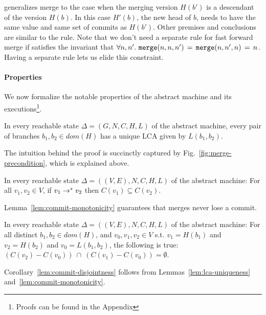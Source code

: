  generalizes merge to the case when the merging
version $H(b')$ is a descendant of the version $H(b)$. In this case
$H'(b)$, the new head of $b$, needs to have the same value and same
set of commits as $H(b')$. Other premises and conclusions are similar
to the  rule. Note that we don't need a separate rule
for fast forward merge if  satisfies the invariant that
$\forall n, n'.~ {\tt merge}(n,n,n') \,=\, {\tt merge}(n,n',n) \,=\, n$.
Having a separate rule lets us elide this constraint.

\paragraph{Properties} We now formalize the notable properties of the
abstract machine and its executions\footnote{Proofs can be found in
the Appendix}.

\begin{lemma}
  \label{lem:lca-uniqueness}
  In every reachable state $\Delta = (G,N,C,H,L)$ of the abstract
  machine, every pair of branches $b_1, b_2 \in dom(H)$ has a unique
  LCA given by $L(b_1,b_2)$.
\end{lemma}

The intuition behind the proof is succinctly captured by
Fig.~\ref{fig:merge-precondition}, which is explained above.

\begin{lemma}
  \label{lem:commit-monotonicity}
  In every reachable state $\Delta = ((V,E),N,C,H,L)$ of the abstract
  machine: For all $v_1,v_2 \in V$, if $v_1 \rightarrow^{*} v_2$ then $C(v_1)
  \subseteq C(v_2)$.
\end{lemma}

Lemma~\ref{lem:commit-monotonicity} guarantees that merges never lose
a commit.

\begin{corollary}
  \label{lem:commit-disjointness}
  In every reachable state $\Delta = ((V,E),N,C,H,L)$ of the abstract
  machine: For all distinct $b_1, b_2 \in dom(H)$, and $v_0, v_1, v_2
  \in V$ s.t.  $v_1 = H(b_1)$ and $v_2 = H(b_2)$ and $v_0 =
  L(b_1,b_2)$, the following is true: $(C(v_2) - C(v_0)) ~\cap~
  (C(v_1) - C(v_0)) = \emptyset$.
\end{corollary}

Corollary~\ref{lem:commit-disjointness} follows from
Lemmas~\ref{lem:lca-uniqueness} and~\ref{lem:commit-monotonicity}.

